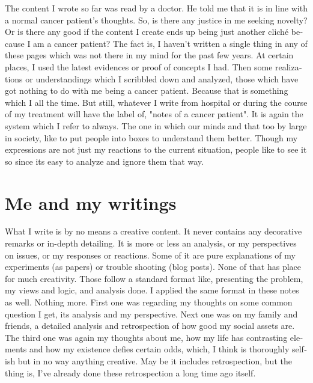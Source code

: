 \begin{english}
The content I wrote so far was read by a doctor. He told me that it is in line with a normal cancer patient's thoughts. So, is there any justice in me seeking novelty? Or is there any good if the content I create ends up being just another cliché because I am a cancer patient? The fact is, I haven't written a single thing in any of these pages which was not there in my mind for the past few years. At certain places, I used the latest evidences or proof of concepts I had. Then some realizations or understandings which I scribbled down and analyzed, those  which have got nothing to do with me being a cancer patient. Because that is something which I all the time. But still, whatever I write from hospital or during the course of my treatment will have the label of, "notes of a cancer patient". It is again the system which I refer to always. The one in which our minds and that too by large in society, like to put people into boxes to understand them better. Though my expressions are not just my reactions to the current situation, people like to see it so since its easy to analyze and ignore them that way.

\section{Me and my writings}

What I write is by no means a creative content. It never contains any decorative remarks or in-depth detailing. It is more or less an analysis, or my perspectives on issues, or my responses or reactions. Some of it are pure explanations of my experiments (as papers) or trouble shooting (blog posts). None of that has place for much creativity. Those follow a standard format like, presenting the problem, my views and logic, and analysis done. I applied the same format in these notes as well. Nothing more. First one was regarding my thoughts on some common question I get, its analysis and my perspective. Next one was on my family and friends, a detailed analysis and retrospection of how good my social assets are. The third one was again my thoughts about me, how my life has contrasting elements and how my existence defies certain odds, which, I think is thoroughly selfish but in no way anything creative. May be it includes retrospection, but the thing is, I've already done these retrospection a long time ago itself.


\end{english}
